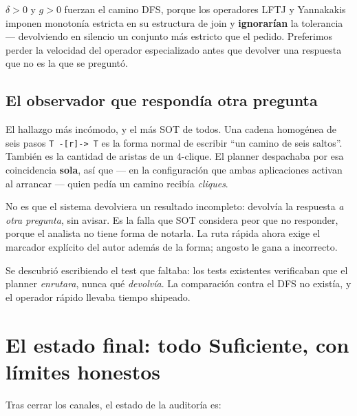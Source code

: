 \documentclass[11pt,a4paper]{article}
\newcommand{\code}[1]{\texttt{\small #1}}
\begin{document}
\begin{warnbox}
$\delta > 0$ y $g > 0$ fuerzan el camino DFS, porque los operadores LFTJ y
Yannakakis imponen monotonía estricta en su estructura de join y
\textbf{ignorarían} la tolerancia --- devolviendo en silencio un conjunto más
estricto que el pedido. Preferimos perder la velocidad del operador
especializado antes que devolver una respuesta que no es la que se preguntó.
\end{warnbox}

\subsection{El observador que respondía otra pregunta}

El hallazgo más incómodo, y el más SOT de todos. Una cadena homogénea de seis
pasos \code{T -[r]-> T} es la forma normal de escribir ``un camino de seis
saltos''. También es la cantidad de aristas de un 4-clique. El planner
despachaba por esa coincidencia \textbf{sola}, así que --- en la configuración
que ambas aplicaciones activan al arrancar --- quien pedía un camino recibía
\emph{cliques}.

\begin{keybox}
No es que el sistema devolviera un resultado incompleto: devolvía la respuesta
\emph{a otra pregunta}, sin avisar. Es la falla que SOT considera peor que no
responder, porque el analista no tiene forma de notarla. La ruta rápida ahora
exige el marcador explícito del autor además de la forma; angosto le gana a
incorrecto.
\end{keybox}

Se descubrió escribiendo el test que faltaba: los tests existentes verificaban
que el planner \emph{enrutara}, nunca qué \emph{devolvía}. La comparación
contra el DFS no existía, y el operador rápido llevaba tiempo shipeado.

\section{El estado final: todo Suficiente, con límites honestos}

Tras cerrar los canales, el estado de la auditoría es:
\end{document}
